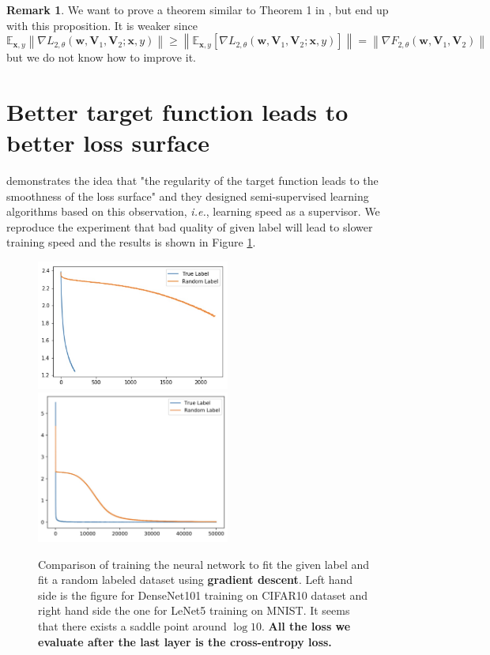 \documentclass{article}
\theoremstyle{plain}
\theoremstyle{definition}
\newtheorem{rem}{Remark}
\newcommand{\norm}[1]{\left\lVert#1\right\rVert}
\begin{document}
\begin{rem}
	We want to prove a theorem similar to Theorem 1 in \cite{2018arXiv180406739S}, but end up with this proposition. It is weaker since
	\[\mathbb{E}_{\mathbf{x},y}\norm{\nabla L_{2,\theta}(\mathbf{w},\mathbf{V}_1,\mathbf{V}_2;\mathbf{x},y)}\geq\norm{\mathbb{E}_{\mathbf{x},y}\left[\nabla L_{2,\theta}(\mathbf{w},\mathbf{V}_1,\mathbf{V}_2;\mathbf{x},y)\right]}=\norm{\nabla F_{2,\theta}(\mathbf{w},\mathbf{V}_1,\mathbf{V}_2)}\]
	but we do not know how to improve it.
\end{rem}

\section{Better target function leads to better loss surface}

\cite{cicek2018saas,cicek2018input} demonstrates the idea that "the regularity of the target function leads to the smoothness of the loss surface" and they designed semi-supervised learning algorithms based on this observation, \emph{i.e.}, learning speed as a supervisor. We reproduce the experiment that bad quality of given label will lead to slower training speed and the results is shown in Figure \ref{saas}.

\begin{figure}[htp]
	\centering
	\includegraphics[width=2.5in]{cifar.jpeg}
	\includegraphics[width=2.5in]{mnist.jpg}
	\caption{Comparison of training the neural network to fit the given label and fit a random labeled dataset using \textbf{gradient descent}. Left hand side is the figure for DenseNet101 training on CIFAR10 dataset and right hand side the one for LeNet5 training on MNIST. It seems that there exists a saddle point around $\log 10$. \textbf{All the loss we evaluate after the last layer is the cross-entropy loss.}}
	\label{saas}
\end{figure}
\end{document}
